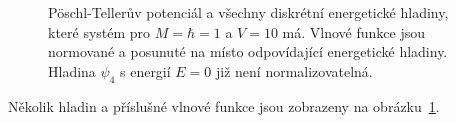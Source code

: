 \begin{solution}
\begin{enumerate}
		\begin{figure}[!htbp]
			\centering
			\caption{
                Pöschl-Tellerův potenciál a všechny diskrétní energetické hladiny, které systém pro $M=\hbar=1$ a $V=10$ má.
                Vlnové funkce jsou normované a posunuté na místo odpovídající energetické hladiny.
                Hladina $\psi_{4}$ s energií $E=0$ již není normalizovatelná.
			}
			\label{fig:PoschlTeller}
        \end{figure}			
        
        Několik hladin a příslušné vlnové funkce jsou zobrazeny na obrázku~\ref{fig:PoschlTeller}.

    \end{enumerate}
\end{solution}
